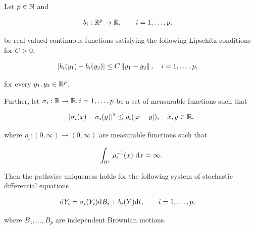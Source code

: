 \begin{theorem}%
    \label{thm:mult_yamada_watanabe}
    Let $p\in \mathbb N$ and %

    \begin{align*}
        b_i&: \R^p \to \R, \qquad i = 1, \dots, p,%
    \end{align*}

    \noindent be real-valued continuous functions satisfying the following Lipschitz conditions for $C>0$,

    \begin{align*}
        \abs{b_i(y_1) - b_i(y_2)} &\le C \norm{y_1 - y_2}, \quad i = 1, \dots, p,%
    \end{align*}

    \noindent for every $y_1, y_2 \in \mathbb R^p$. %

    Further, let $\sigma_i:\mathbb R \to \mathbb R, i =1, \dots, p$ be a set of measurable functions such that

    \[ \lvert \sigma_i(x) - \sigma_i(y) \rvert^2 \le \rho_i(\lvert x-y \rvert), \quad x,y \in \mathbb R, \]

    \noindent where $\rho_i:(0,\infty)\to(0,\infty)$ are measurable functions such that 

    \[ \int_{0^+} \rho_i^{-1}(x)~\mathrm d x = \infty.\]

    Then the pathwise uniqueness holds for the following system of stochastic differential equations

    \begin{align}
        \d Y_i &= \sigma_i(Y_i)\d B_i + b_i(Y)\d t, \qquad i = 1, \dots, p,%
    \end{align}

    \noindent where $B_1, \dots, B_{p}$ are independent Brownian motions.
\end{theorem}

